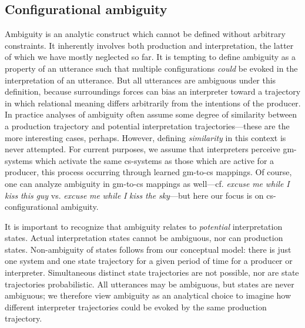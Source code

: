 \subsection{Configurational ambiguity}

Ambiguity is an analytic construct which cannot be defined without arbitrary constraints. It inherently  involves both production and interpretation, the latter of which we have mostly neglected so far. It is tempting to define ambiguity as a property of an utterance such that multiple configurations \textit{could} be evoked in the interpretation of an utterance. But all utterances are ambiguous under this definition, because surroundings forces can bias an interpreter toward a trajectory in which relational meaning differs arbitrarily from the intentions of the producer. In practice analyses of ambiguity often assume some degree of similarity between a production trajectory and potential interpretation trajectories—these are the more interesting cases, perhaps. However, defining \textit{similarity} in this context is never attempted. For current purposes, we assume that interpreters perceive gm-systems which activate the same cs-systems as those which are active for a producer, this process occurring through learned gm-to-cs mappings. Of course, one can analyze ambiguity in gm-to-cs mappings as well—cf. \textit{excuse} \textit{me} \textit{while} \textit{I} \textit{kiss} \textit{this} \textit{guy} vs. \textit{excuse} \textit{me} \textit{while} \textit{I} \textit{kiss} \textit{the} \textit{sky}—but here our focus is on cs-configurational ambiguity. 

  It is important to recognize that ambiguity relates to \textit{potential} interpretation states. Actual interpretation states cannot be ambiguous, nor can production states. Non-ambiguity of states follows from our conceptual model: there is just one system and one state trajectory for a given period of time for a producer or interpreter. Simultaneous distinct state trajectories are not possible, nor are state trajectories probabilistic. All utterances may be ambiguous, but states are never ambiguous; we therefore view ambiguity as an analytical choice to imagine how different interpreter trajectories could be evoked by the same production trajectory.


